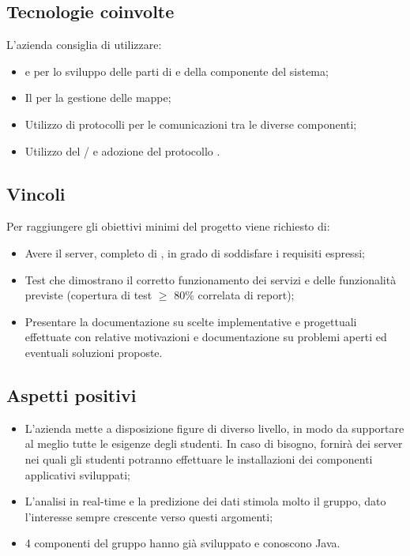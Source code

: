 \subsection{Tecnologie coinvolte}
L'azienda consiglia di utilizzare:
\begin{itemize}
	\item {} e  per lo sviluppo delle parti di  e  della componente  del sistema;
	\item Il   per la gestione delle mappe;
	\item Utilizzo di protocolli  per le comunicazioni tra le diverse componenti;
	\item Utilizzo del  / e adozione del protocollo . 
\end{itemize}

\subsection{Vincoli}
Per raggiungere gli obiettivi minimi del progetto viene richiesto di:
\begin{itemize}
	\item Avere il server, completo di , in grado di soddisfare i requisiti espressi;
	\item Test che dimostrano il corretto funzionamento dei servizi e delle funzionalità previste (copertura di test $\geq$ 80\% correlata di report);
	\item Presentare la documentazione su scelte implementative e progettuali effettuate con relative motivazioni e documentazione su problemi aperti ed eventuali soluzioni proposte.
\end{itemize}

\subsection{Aspetti positivi}
\begin{itemize}
	\item L'azienda mette a disposizione figure di diverso livello, in modo da supportare al meglio tutte le esigenze degli studenti. In caso di bisogno, fornirà dei server nei quali gli studenti potranno effettuare le installazioni dei componenti applicativi sviluppati;
	\item L'analisi in real-time e la predizione dei dati stimola molto il gruppo, dato l'interesse sempre crescente verso questi argomenti; 
	\item 4 componenti del gruppo hanno già sviluppato e conoscono Java.
\end{itemize}

